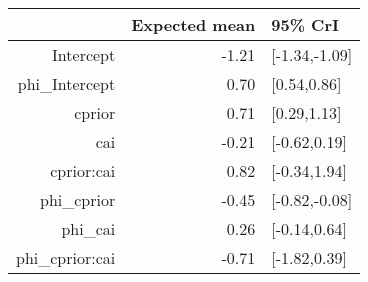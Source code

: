 \begin{tabular}{rrl}
  \hline
 & Expected mean & 95\% CrI \\ 
  \hline
Intercept & -1.21 & [-1.34,-1.09] \\ 
  phi\_Intercept & 0.70 & [0.54,0.86] \\ 
  cprior & 0.71 & [0.29,1.13] \\ 
  cai & -0.21 & [-0.62,0.19] \\ 
  cprior:cai & 0.82 & [-0.34,1.94] \\ 
  phi\_cprior & -0.45 & [-0.82,-0.08] \\ 
  phi\_cai & 0.26 & [-0.14,0.64] \\ 
  phi\_cprior:cai & -0.71 & [-1.82,0.39] \\ 
   \hline
\end{tabular}

